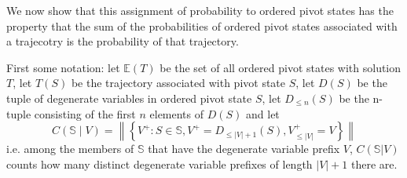 \documentclass{article}
\begin{document}
We now show that this assignment of probability to ordered pivot states has the property that the sum of the probabilities of ordered pivot states associated with a trajecotry is the probability of that trajectory.

First some notation: let $\mathbb{E}(T)$ be the set of all ordered pivot states with solution $T$, let $T(S)$ be the trajectory associated with pivot state $S$, let $D(S)$ be the tuple of degenerate variables in ordered pivot state $S$, let $D_{\le n}(S)$ be the n-tuple consisting of the first $n$ elements of $D(S)$ and let
\begin{equation}
C(\mathbb{S} \mid V) = \left\|\left\{ V^+ :  S \in \mathbb{S}, V^+ = D_{\le |V|+1}(S), V^+_{\le |V|}=V \right\}\right\|
\label{count}
\end{equation}
i.e. among the members of $\mathbb{S}$ that have the degenerate variable prefix $V$, $C(\mathbb{S}|V)$ counts how many distinct degenerate variable prefixes of length $|V|+1$ there are.
\end{document}
